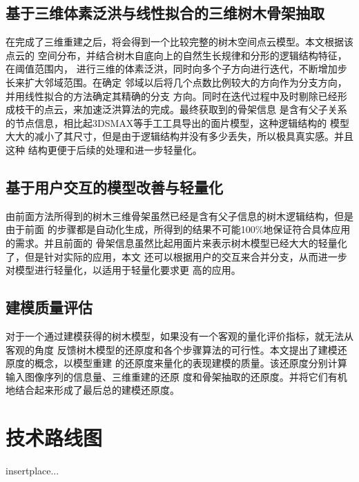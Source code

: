 \subsection{基于三维体素泛洪与线性拟合的三维树木骨架抽取}
\label{subsec:treesklextract}
在完成了三维重建之后，将会得到一个比较完整的树木空间点云模型。本文根据该点云的
空间分布，并结合树木自底向上的自然生长规律和分形的逻辑结构特征，在阈值范围内，
进行三维的体素泛洪，同时向多个子方向进行迭代，不断增加步长来扩大邻域范围。在确定
邻域以后将几个点数比例较大的方向作为分支方向，并用线性拟合的方法确定其精确的分支
方向。同时在迭代过程中及时剔除已经形成枝干的点云，来加速泛洪算法的完成。最终获取到的骨架信息
是含有父子关系的节点信息，相比起3DSMAX等手工工具导出的面片模型，这种逻辑结构的
模型大大的减小了其尺寸，但是由于逻辑结构并没有多少丢失，所以极具真实感。并且这种
结构更便于后续的处理和进一步轻量化。

\subsection{基于用户交互的模型改善与轻量化}
\label{subsec:userinteraction}
由前面方法所得到的树木三维骨架虽然已经是含有父子信息的树木逻辑结构，但是由于前面
的步骤都是自动化生成，所得到的结果不可能100\%地保证符合具体应用的需求。并且前面的
骨架信息虽然比起用面片来表示树木模型已经大大的轻量化了，但是针对实际的应用，本文
还可以根据用户的交互来合并分支，从而进一步对模型进行轻量化，以适用于轻量化要求更
高的应用。

\subsection{建模质量评估}
\label{subsec:qualityevaluation}
对于一个通过建模获得的树木模型，如果没有一个客观的量化评价指标，就无法从客观的角度
反馈树木模型的还原度和各个步骤算法的可行性。本文提出了建模还原度的概念，以模型重建
的还原度来量化的表现建模的质量。该还原度分别计算输入图像序列的信息量、三维重建的还原
度和骨架抽取的还原度。并将它们有机地结合起来形成了最后总的建模还原度。

\section{技术路线图}
\label{sec:techrouteimg}
insertplace...
